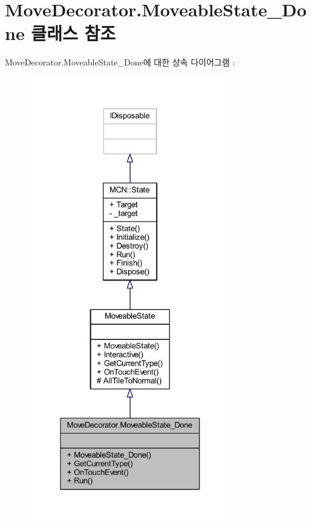\hypertarget{class_move_decorator_1_1_moveable_state___done}{}\section{Move\+Decorator.\+Moveable\+State\+\_\+\+Done 클래스 참조}
\label{class_move_decorator_1_1_moveable_state___done}


Move\+Decorator.\+Moveable\+State\+\_\+\+Done에 대한 상속 다이어그램 \+: 
\nopagebreak
\begin{figure}[H]
\begin{center}
\leavevmode
\includegraphics[height=550pt]{class_move_decorator_1_1_moveable_state___done__inherit__graph}
\end{center}
\end{figure}


